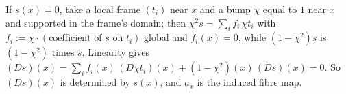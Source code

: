 If $s(x) = 0$, take a local frame $(t_i)$ near $x$ and a bump $\chi$ equal to $1$ near $x$ and supported in the frame's domain; then $\chi^2 s = \sum_i f_i\, \chi t_i$ with $f_i := \chi \cdot (\text{coefficient of } s \text{ on } t_i)$ global and $f_i(x) = 0$, while $(1 - \chi^2)s$ is $(1 - \chi^2)$ times $s$. Linearity gives $(Ds)(x) = \sum_i f_i(x)\,(D\chi t_i)(x) + (1 - \chi^2)(x)\,(Ds)(x) = 0$. So $(Ds)(x)$ is determined by $s(x)$, and $a_x$ is the induced fibre map.
